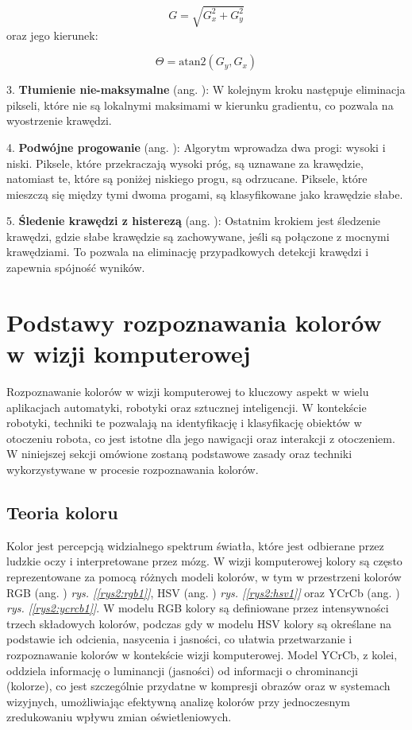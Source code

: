 \[
G = \sqrt{G_x^2 + G_y^2}
\]
oraz jego kierunek:

\[
\Theta = \text{atan2}(G_y, G_x)
\]

3. \textbf{Tłumienie nie-maksymalne} (ang. ): W kolejnym kroku następuje eliminacja pikseli, które nie są lokalnymi maksimami w kierunku gradientu, co pozwala na wyostrzenie krawędzi.

4. \textbf{Podwójne progowanie} (ang. ): Algorytm wprowadza dwa progi: wysoki i niski. Piksele, które przekraczają wysoki próg, są uznawane za krawędzie, natomiast te, które są poniżej niskiego progu, są odrzucane. Piksele, które mieszczą się między tymi dwoma progami, są klasyfikowane jako krawędzie słabe.

5. \textbf{Śledenie krawędzi z histerezą} (ang. ): Ostatnim krokiem jest śledzenie krawędzi, gdzie słabe krawędzie są zachowywane, jeśli są połączone z mocnymi krawędziami. To pozwala na eliminację przypadkowych detekcji krawędzi i zapewnia spójność wyników.

\section{Podstawy rozpoznawania kolorów w wizji komputerowej}

Rozpoznawanie kolorów w wizji komputerowej to kluczowy aspekt w wielu aplikacjach automatyki, robotyki oraz sztucznej inteligencji. W kontekście robotyki, techniki te pozwalają na identyfikację i klasyfikację obiektów w otoczeniu robota, co jest istotne dla jego nawigacji oraz interakcji z otoczeniem. W niniejszej sekcji omówione zostaną podstawowe zasady oraz techniki wykorzystywane w procesie rozpoznawania kolorów.

\subsection{Teoria koloru}


Kolor jest percepcją widzialnego spektrum światła, które jest odbierane przez ludzkie oczy i interpretowane przez mózg. W wizji komputerowej kolory są często reprezentowane za pomocą różnych modeli kolorów, w tym w przestrzeni kolorów RGB (ang. ) \textit{rys. [\ref{rys2:rgb1}]}, HSV (ang. ) \textit{rys. [\ref{rys2:hsv1}]} oraz YCrCb (ang. ) \textit{rys. [\ref{rys2:ycrcb1}]}. W modelu RGB kolory są definiowane przez intensywności trzech składowych kolorów, podczas gdy w modelu HSV kolory są określane na podstawie ich odcienia, nasycenia i jasności, co ułatwia przetwarzanie i rozpoznawanie kolorów w kontekście wizji komputerowej. Model YCrCb, z kolei, oddziela informację o luminancji (jasności) od informacji o chrominancji (kolorze), co jest szczególnie przydatne w kompresji obrazów oraz w systemach wizyjnych, umożliwiając efektywną analizę kolorów przy jednoczesnym zredukowaniu wpływu zmian oświetleniowych.


